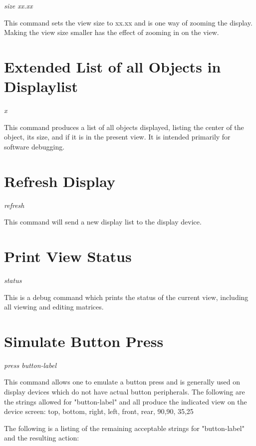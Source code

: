 {\em\center
size xx.xx
}

This command sets the view size to xx.xx and is one way of zooming
the display.
Making the view size smaller has the effect of zooming in on the view.

\section{Extended List of all Objects in Displaylist}

{\em\center
x
}

This command produces a list of all objects displayed, listing the center
of the object, its size, and if it is in the present view.
It is intended primarily for software debugging.

\section{Refresh Display}

{\em\center
refresh
}

This command will send a new display list to the display device.

\section{Print View Status}

{\em\center
status
}

This is a debug command which prints the status of the current view,
including all viewing and editing matrices.

\section{Simulate Button Press}

{\em\center
press button-label
}

This command allows one to emulate a button press and is generally used
on display devices which do not have actual button peripherals.
The following are the strings allowed for "button-label" and all produce
the indicated view on the device screen:
        top, bottom, right, left, front, rear, 90,90, 35,25

The following is a listing of the remaining acceptable strings for
"button-label" and the resulting action:

